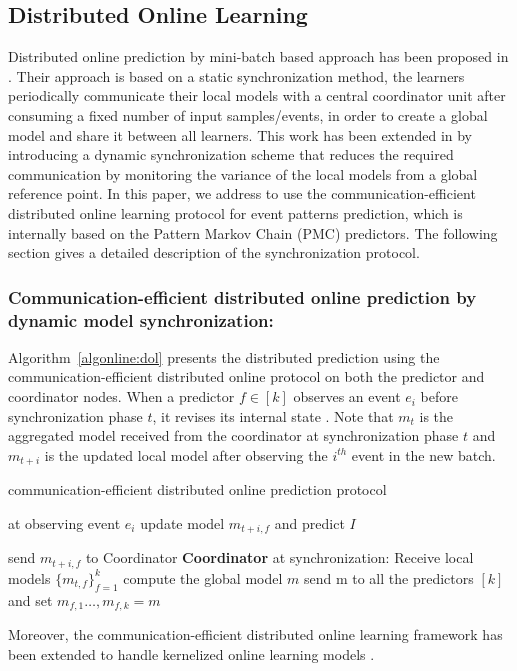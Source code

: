 \subsection{Distributed Online Learning}

Distributed online prediction by mini-batch based approach has been proposed in \cite{dekel2012optimal}. Their approach is based on a static synchronization method,  the learners periodically communicate  their local models with a central coordinator unit after consuming a fixed number of input samples/events, in order to  create a global model and share it between all learners. This work has been extended in \cite{kamp2014communication} by introducing a
dynamic synchronization scheme that reduces the required communication by monitoring the variance of the local models from a global reference point. In this paper, we address to use the communication-efficient distributed online learning protocol for event patterns prediction, which is internally based on the Pattern Markov Chain (PMC) predictors. The following section gives a detailed description of the synchronization protocol.
\subsubsection*{Communication-efficient distributed online prediction by dynamic model synchronization:}

Algorithm~\ref{algonline:dol} presents the distributed prediction using the communication-efficient distributed online protocol on both the predictor and coordinator nodes. When a predictor $f\in[k]$ observes an event $e_i$ before synchronization phase $t$, it revises its internal state . Note that $m_t$ is the aggregated model received from the coordinator at synchronization phase $t$ and $m_{t+i}$ is the updated local model after observing the $i^{th}$ event in the new batch.

\begin{algorithm}
	\caption{communication-efficient distributed online prediction protocol} 
	\begin{algorithmic}[1] 
		 at observing event $e_i$
		\Statex \Indp update model $m_{t+i,f}$ and predict $I$

		\Statex {}  
		\Statex send $m_{t+i,f}$ to Coordinator 
		\Statex \Indm \Indm \textbf{Coordinator} at synchronization:
		\Statex \Indp Receive local models $\{m_{t,f}\}_{f=1}^k$ 	
		\Statex  compute the global model $m$ 
		\Statex send m to all the predictors $[k]$ and set $m_{f,1}\dots, m_{f,k}=m$
	\end{algorithmic}
	\label{algonline:dol}
\end{algorithm}


Moreover, the communication-efficient distributed online learning framework has been extended to handle kernelized online learning models \cite{kamp2016communication}.
